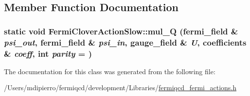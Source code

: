 \subsection{Member Function Documentation}
\hypertarget{class_fermi_clover_action_slow_a8e9b281981e3907873fc08c52f2c3d21}{
\subsubsection[{mul\_\-Q}]{\setlength{\rightskip}{0pt plus 5cm}static void FermiCloverActionSlow::mul\_\-Q ({\bf fermi\_\-field} \& {\em psi\_\-out}, \/  {\bf fermi\_\-field} \& {\em psi\_\-in}, \/  {\bf gauge\_\-field} \& {\em U}, \/  {\bf coefficients} \& {\em coeff}, \/  int {\em parity} = {})}}
\label{class_fermi_clover_action_slow_a8e9b281981e3907873fc08c52f2c3d21}


The documentation for this class was generated from the following file:\begin{DoxyCompactItemize}
\item 
/Users/mdipierro/fermiqcd/development/Libraries/\hyperlink{fermiqcd__fermi__actions_8h}{fermiqcd\_\-fermi\_\-actions.h}\end{DoxyCompactItemize}
